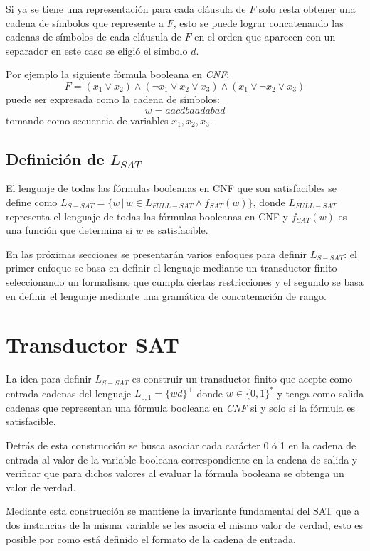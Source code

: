 \documentclass[12pt]{article}
\begin{document}
Si ya se tiene una representación para cada cláusula de $F$ solo resta obtener una cadena de símbolos que represente a $F$,
esto se puede lograr concatenando las cadenas de símbolos de cada cláusula de $F$ en el orden que aparecen con un separador
en este caso se eligió el símbolo $d$.

Por ejemplo la siguiente fórmula booleana en \textit{CNF}:
$$F=(x_1 \vee x_2) \wedge (\neg x_1 \vee x_2 \vee x_3) \wedge (x_1 \vee \neg x_2 \vee x_3)$$
puede ser expresada como la cadena de símbolos:
$$w=aacdbaadabad$$
tomando como secuencia de variables $x_1, x_2, x_3$.


\subsection{Definición de $L_{SAT}$}

El lenguaje de todas las fórmulas booleanas en CNF que son satisfacibles se define como $L_{S-SAT}=\{w\,|\,w \in L_{FULL-SAT} \wedge f_{SAT}(w)\}$, 
donde $L_{FULL-SAT}$ representa el lenguaje de todas las fórmulas booleanas en CNF y $f_{SAT}(w)$ es una función que 
determina si $w$ es satisfacible.

En las próximas secciones se presentarán varios enfoques para definir $L_{S-SAT}$: el primer enfoque se basa en definir
el lenguaje mediante un transductor finito seleccionando un formalismo que cumpla ciertas restricciones y el segundo se
basa en definir el lenguaje mediante una gramática de concatenación de rango. 

\section{Transductor SAT}

La idea para definir $L_{S-SAT}$ es construir un transductor finito que acepte como entrada cadenas del lenguaje $L_{0,1}=\{wd\}^+$ donde $w\in \{0,1\}^*$
y tenga como salida cadenas que representan una fórmula booleana en \textit{CNF}  si y solo si la fórmula es satisfacible. 

Detrás de esta construcción se busca asociar cada carácter 0 ó 1 en la cadena de entrada al valor de la variable booleana correspondiente en la cadena de salida y verificar que para dichos
valores al evaluar la fórmula booleana se obtenga un valor de verdad. 

Mediante esta construcción se mantiene la invariante fundamental del SAT que a dos instancias
de la misma variable se les asocia el mismo valor de verdad, esto es posible por como está definido el formato de la cadena de entrada.
\end{document}
